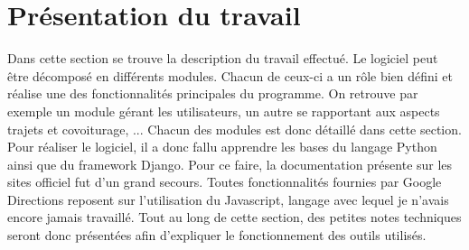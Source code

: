 \documentclass[12pt, a4paper, oneside]{article}
\begin{document}
\section{Présentation du travail}\label{taff}
    Dans cette section se trouve la description du travail effectué. Le logiciel peut être décomposé en différents modules. Chacun de ceux-ci a un rôle bien défini et réalise une des fonctionnalités principales du programme.  On retrouve par exemple un module gérant les utilisateurs, un autre se rapportant aux aspects trajets et covoiturage, ... Chacun des modules est donc détaillé dans cette section.\\
    \indent Pour réaliser le logiciel, il a donc fallu apprendre les bases du langage Python ainsi que du framework Django. Pour ce faire, la documentation présente sur les sites officiel fut d'un grand secours. Toutes fonctionnalités fournies par Google Directions reposent sur l'utilisation du Javascript, langage avec lequel je n'avais encore jamais travaillé. Tout au long de cette section, des petites notes techniques seront donc présentées afin d'expliquer le fonctionnement des outils utilisés.\\
\end{document}

